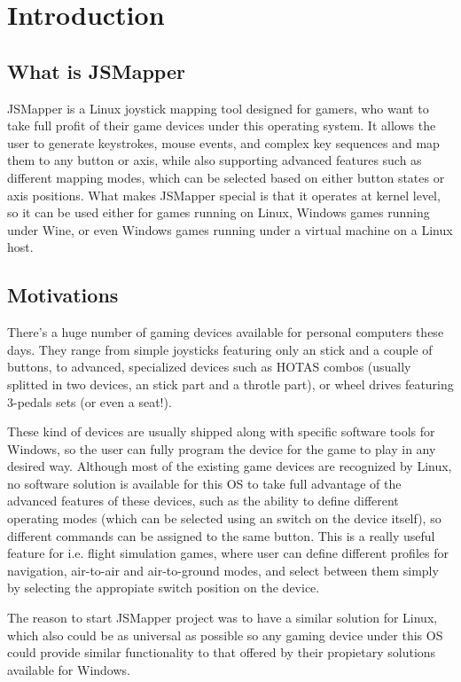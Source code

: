 \chapter{Introduction}\label{chap:intro}
\section{What is JSMapper}
JSMapper is a Linux joystick mapping tool designed for gamers, who want to take full profit of their game devices under this operating system. It allows the user to generate keystrokes, mouse events, and complex key sequences and map them to any button or axis, while also supporting advanced features such as different mapping modes, which can be selected based on either button states or axis positions.
What makes JSMapper special is that it operates at kernel level, so it can be used either for games running on Linux, Windows games running under Wine, or even Windows games running under a virtual machine on a Linux host.

\section{Motivations}
There's a huge number of gaming devices available for personal computers these days. They range from simple joysticks featuring only an stick and a couple of buttons, to advanced, specialized devices such as HOTAS combos (usually splitted in two devices, an stick part and a throtle part), or wheel drives featuring 3-pedals sets (or even a seat!).

These kind of devices are usually shipped along with specific software tools for Windows, so the user can fully program the device for the game to play in any desired way. Although most of the existing game devices are recognized by Linux, no software solution is available for this OS to take full advantage of the advanced features of these devices, such as the ability to define different operating modes (which can be selected using an switch on the device itself), so different commands can be assigned to the same button. This is a really useful feature for i.e. flight simulation games, where user can define different profiles for navigation, air-to-air and air-to-ground modes, and select between them simply by selecting the appropiate switch position on the device.

The reason to start JSMapper project was to have a similar solution for Linux, which also could be as universal as possible so any gaming device under this OS could provide similar functionality to that offered by their propietary solutions available for Windows. 


